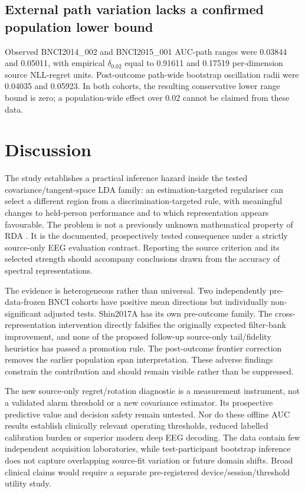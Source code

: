 \documentclass[11pt,a4paper]{article}
\begin{document}
\subsection{External path variation lacks a confirmed population lower bound}
Observed BNCI2014\_002 and BNCI2015\_001 AUC-path ranges were
0.03844 and 0.05011, with empirical \(\delta_{0.02}\) equal
to 0.91611 and 0.17519 per-dimension source NLL-regret units.
Post-outcome path-wide bootstrap oscillation radii were 0.04035
and 0.05923. In both cohorts, the resulting conservative
lower range bound is zero; a population-wide effect over 0.02
cannot be claimed from these data.





\section{Discussion}
The study establishes a practical inference hazard inside the tested
covariance/tangent-space LDA family: an estimation-targeted regulariser
can select a different region from a discrimination-targeted rule, with
meaningful changes to held-person performance and to which
representation appears favourable. The problem is not a previously
unknown mathematical property of RDA \cite{friedman1989}.
It is the documented, prospectively tested consequence under a strictly
source-only EEG evaluation contract. Reporting the source criterion and
its selected strength should accompany conclusions drawn from the
accuracy of spectral representations.

The evidence is heterogeneous rather than universal. Two independently
pre-data-frozen BNCI cohorts have positive mean directions but individually
non-significant adjusted tests. Shin2017A has its own pre-outcome family.
The cross-representation intervention directly falsifies the originally
expected filter-bank improvement, and none of the proposed follow-up
source-only tail/fidelity heuristics has passed a promotion rule.
The post-outcome frontier correction removes the earlier population
span interpretation. These adverse findings constrain the contribution
and should remain visible rather than be suppressed.

The new source-only regret/rotation diagnostic is a measurement instrument,
not a validated alarm threshold or a new covariance estimator. Its
prospective predictive value and decision safety remain untested. Nor do
these offline AUC results establish clinically relevant operating thresholds,
reduced labelled calibration burden or superior modern deep EEG decoding.
The data contain few independent acquisition laboratories, while
test-participant bootstrap inference does not capture overlapping
source-fit variation or future domain shifts. Broad clinical claims
would require a separate pre-registered device/session/threshold utility study.
\end{document}
